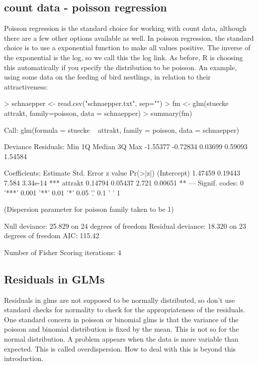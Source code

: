 \documentclass[a4paper,twoside]{tufte-book} %
\begin{document}
\subsection{count data - poisson regression}

Poisson regression is the standard choice for working with count data, although there are a few other options available as well. In poisson regression, the standard choice is to use a exponential function to make all values positive. The inverse of the exponential is the log, so we call this the log link. As before, R is choosing this automatically if you specify the distribution to be poisson. An example, using some data on the feeding of bird nestlings, in relation to their attractiveness:
\begin{Schunk}
\begin{Sinput}
> schnaepper <- read.csv("schnaepper.txt", sep="")
> fm <- glm(stuecke ~ attrakt, family=poisson, data = schnaepper)
> summary(fm)
\end{Sinput}
\begin{Soutput}
Call:
glm(formula = stuecke ~ attrakt, family = poisson, data = schnaepper)

Deviance Residuals: 
     Min        1Q    Median        3Q       Max  
-1.55377  -0.72834   0.03699   0.59093   1.54584  

Coefficients:
            Estimate Std. Error z value Pr(>|z|)    
(Intercept)  1.47459    0.19443   7.584 3.34e-14 ***
attrakt      0.14794    0.05437   2.721  0.00651 ** 
---
Signif. codes:  0 '***' 0.001 '**' 0.01 '*' 0.05 '.' 0.1 ' ' 1

(Dispersion parameter for poisson family taken to be 1)

    Null deviance: 25.829  on 24  degrees of freedom
Residual deviance: 18.320  on 23  degrees of freedom
AIC: 115.42

Number of Fisher Scoring iterations: 4
\end{Soutput}
\end{Schunk}

\subsection{Residuals in GLMs}

Residuals in glms are not supposed to be normally distributed, so don't use standard checks for normality to check for the appropriateness of the residuals. One standard concern in poisson or binomial glms is that the variance of the poisson and binomial distribution is fixed by the mean. This is not so for the normal distribution. A problem appears when the data is more variable than expected. This is called overdispersion. How to deal with this is beyond this introduction. 
\end{document}
